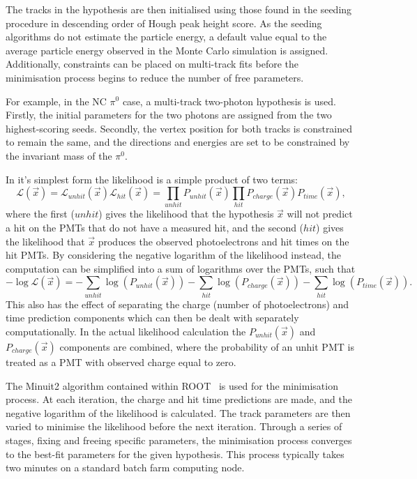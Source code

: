 The tracks in the hypothesis are then initialised using those found in the seeding procedure in
descending order of Hough peak height score. As the seeding algorithms do not estimate the
particle energy, a default value equal to the average particle energy observed in the Monte Carlo
simulation is assigned. Additionally, constraints can be placed on multi-track fits before the
minimisation process begins to reduce the number of free parameters.

For example, in the NC $\pi^{0}$ case, a multi-track two-photon hypothesis is used. Firstly, the
initial parameters for the two photons are assigned from the two highest-scoring seeds. Secondly,
the vertex position for both tracks is constrained to remain the same, and the directions and
energies are set to be constrained by the invariant mass of the $\pi^{0}$.

In it's simplest form the likelihood is a simple product of two terms:
\begin{equation} %
    \mathcal{L}(\vec{x})=\mathcal{L}_{unhit}(\vec{x})\mathcal{L}_{hit}(\vec{x})=
    \prod_{unhit}P_{unhit}(\vec{x})\prod_{hit}P_{charge}(\vec{x})P_{time}(\vec{x}),
    \label{eq:likelihood}
\end{equation}
where the first ($unhit$) gives the likelihood that the hypothesis $\vec{x}$ will not predict a
hit on the PMTs that do not have a measured hit, and the second ($hit$) gives the likelihood that
$\vec{x}$ produces the observed photoelectrons and hit times on the hit PMTs. By considering the
negative logarithm of the likelihood instead, the computation can be simplified into a sum of
logarithms over the PMTs, such that
\begin{equation} %
    -\log\mathcal{L}(\vec{x})=
    -\sum_{unhit}\log(P_{unhit}(\vec{x}))
    -\sum_{hit}\log(P_{charge}(\vec{x}))
    -\sum_{hit}\log(P_{time}(\vec{x})).
    \label{eq:likelihood_sum}
\end{equation}
This also has the effect of separating the charge (number of photoelectrons) and time prediction
components which can then be dealt with separately computationally. In the actual likelihood
calculation the $P_{unhit}(\vec{x})$ and $P_{charge}(\vec{x})$ components are combined, where the
probability of an unhit PMT is treated as a PMT with observed charge equal to zero.

The Minuit2 algorithm contained within ROOT~\cite{brun1997} is used for the minimisation process.
At each iteration, the charge and hit time predictions are made, and the negative logarithm of the
likelihood is calculated. The track parameters are then varied to minimise the likelihood before
the next iteration. Through a series of stages, fixing and freeing specific parameters, the
minimisation process converges to the best-fit parameters for the given hypothesis. This process
typically takes two minutes on a standard batch farm computing node.

